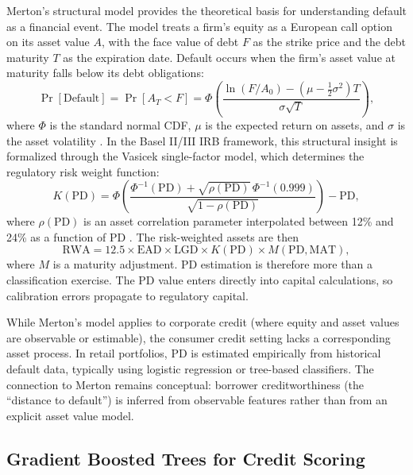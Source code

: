 \documentclass[11pt, a4paper]{article}
\newcommand{\PD}{\text{PD}}
\newcommand{\LGD}{\text{LGD}}
\newcommand{\EAD}{\text{EAD}}
\begin{document}
Merton's \citeyear{merton1974} structural model provides the theoretical basis for understanding default as a financial event. The model treats a firm's equity as a European call option on its asset value $A$, with the face value of debt $F$ as the strike price and the debt maturity $T$ as the expiration date. Default occurs when the firm's asset value at maturity falls below its debt obligations:
\begin{equation}
\label{eq:merton_default}
\Pr[\text{Default}] = \Pr[A_T < F] = \Phi\!\left(\frac{\ln(F/A_0) - (\mu - \tfrac{1}{2}\sigma^2)T}{\sigma\sqrt{T}}\right),
\end{equation}
where $\Phi$ is the standard normal CDF, $\mu$ is the expected return on assets, and $\sigma$ is the asset volatility \parencite{merton1974}. In the Basel II/III IRB framework, this structural insight is formalized through the Vasicek single-factor model, which determines the regulatory risk weight function:
\begin{equation}
\label{eq:irb_rwa}
K(\PD) = \Phi\!\left(\frac{\Phi^{-1}(\PD) + \sqrt{\rho(\PD)}\,\Phi^{-1}(0.999)}{\sqrt{1 - \rho(\PD)}}\right) - \PD,
\end{equation}
where $\rho(\PD)$ is an asset correlation parameter interpolated between 12\% and 24\% as a function of PD \parencite{bluhm2010, bcbs_basel_framework_2024}. The risk-weighted assets are then
\begin{equation}
\text{RWA} = 12.5 \times \EAD \times \LGD \times K(\PD) \times M(\PD, \text{MAT}),
\end{equation}
where $M$ is a maturity adjustment. PD estimation is therefore more than a classification exercise. The PD value enters directly into capital calculations, so calibration errors propagate to regulatory capital.

While Merton's model applies to corporate credit (where equity and asset values are observable or estimable), the consumer credit setting lacks a corresponding asset process. In retail portfolios, PD is estimated empirically from historical default data, typically using logistic regression or tree-based classifiers. The connection to Merton remains conceptual: borrower creditworthiness (the ``distance to default'') is inferred from observable features rather than from an explicit asset value model.

\subsection{Gradient Boosted Trees for Credit Scoring}
\end{document}
